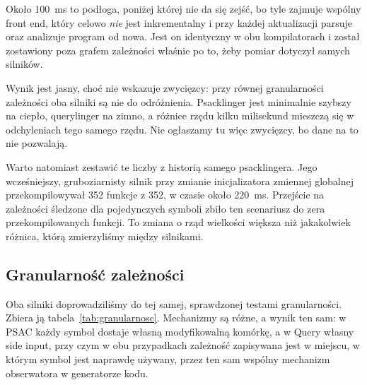 \documentclass[11pt,a4paper]{article}
\begin{document}
Około 100~ms to podłoga, poniżej której nie da się zejść, bo tyle zajmuje wspólny
front end, który celowo \emph{nie} jest inkrementalny i przy każdej aktualizacji
parsuje oraz analizuje program od nowa. Jest on identyczny w obu kompilatorach
i został zostawiony poza grafem zależności właśnie po to, żeby pomiar dotyczył
samych silników.

Wynik jest jasny, choć nie wskazuje zwycięzcy: przy równej granularności
zależności oba silniki są nie do odróżnienia. Psacklinger jest minimalnie szybszy
na ciepło, querylinger na zimno, a różnice rzędu kilku milisekund mieszczą się
w odchyleniach tego samego rzędu. Nie ogłaszamy tu więc zwycięzcy, bo dane na to %
nie pozwalają.

Warto natomiast zestawić te liczby z historią samego psacklingera. Jego
wcześniejszy, gruboziarnisty silnik przy zmianie inicjalizatora zmiennej %
globalnej przekompilowywał 352 funkcje z 352, w czasie około 220~ms. Przejście na
zależności śledzone dla pojedynczych symboli zbiło ten scenariusz do zera
przekompilowanych funkcji. To zmiana o rząd wielkości większa niż jakakolwiek
różnica, którą zmierzyliśmy między silnikami.

\subsection{Granularność zależności}

Oba silniki doprowadziliśmy do tej samej, sprawdzonej testami granularności.
Zbiera ją tabela~\ref{tab:granularnosc}. Mechanizmy są różne, a wynik ten sam:
w PSAC każdy symbol dostaje własną modyfikowalną komórkę, a w Query własny side
input, przy czym w obu przypadkach zależność zapisywana jest w miejscu, w którym
symbol jest naprawdę używany, przez ten sam wspólny mechanizm obserwatora %
w generatorze kodu.
\end{document}
